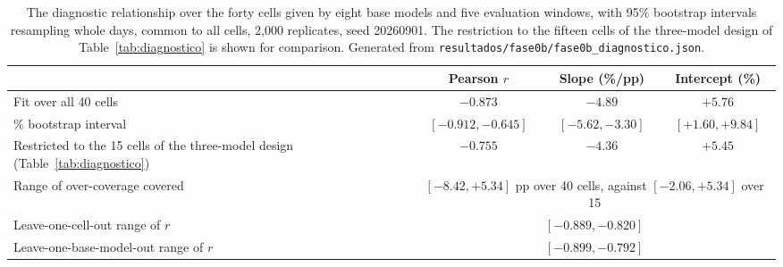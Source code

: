 \begin{table}[t]
\centering
\footnotesize
\caption{The diagnostic relationship over the forty cells given by eight base models and five evaluation windows, with 95\% bootstrap intervals resampling whole days, common to all cells, 2{,}000 replicates, seed 20260901. The restriction to the fifteen cells of the three-model design of Table~\ref{tab:diagnostico} is shown for comparison. Generated from \texttt{resultados/fase0b/fase0b\_diagnostico.json}.}
\label{tab:diag_ampliado}
\begin{tabular}{lccc}
\toprule
& Pearson $r$ & Slope (\%/pp) & Intercept (\%) \\
\midrule
Fit over all 40 cells & $-0.873$ & $-4.89$ & $+5.76$ \\
\quad 95\% bootstrap interval & $[-0.912, -0.645]$ & $[-5.62, -3.30]$ & $[+1.60, +9.84]$ \\
\addlinespace
Restricted to the 15 cells of the three-model design (Table~\ref{tab:diagnostico}) & $-0.755$ & $-4.36$ & $+5.45$ \\
\addlinespace
Range of over-coverage covered & \multicolumn{3}{c}{$[-8.42, +5.34]$ pp over 40 cells, against $[-2.06, +5.34]$ over 15} \\
Leave-one-cell-out range of $r$ & \multicolumn{3}{c}{$[-0.889, -0.820]$} \\
Leave-one-base-model-out range of $r$ & \multicolumn{3}{c}{$[-0.899, -0.792]$} \\
\bottomrule
\end{tabular}
\end{table}
